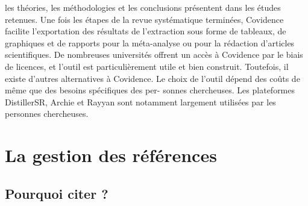 \documentclass[
  letterpaper,
]{scrbook}
\begin{document}
les théories, les méthodologies et les conclusions présentent dans les
études retenues. Une fois les étapes de la revue systématique terminées,
Covidence facilite l'exportation des résultats de l'extraction sous
forme de tableaux, de graphiques et de rapports pour la méta-analyse ou
pour la rédaction d'articles scientifiques. De nombreuses universités
offrent un accès à Covidence par le biais de licences, et l'outil est
particulièrement utile et bien construit. Toutefois, il existe d'autres
alternatives à Covidence. Le choix de l'outil dépend des coûts de même
que des besoins spécifiques des per- sonnes chercheuses. Les plateformes
DistillerSR, Archie et Rayyan sont notamment largement utilisées par les
personnes chercheuses.


\hypertarget{sec-chap6}{%
\chapter{La gestion des références}\label{sec-chap6}}

\hypertarget{pourquoi-citer}{%
\section{Pourquoi citer ?}\label{pourquoi-citer}}
\end{document}
